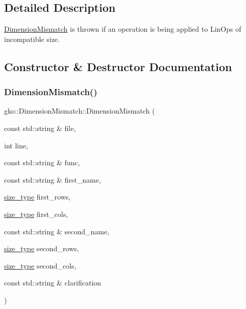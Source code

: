 \subsection{Detailed Description}
\hyperlink{classgko_1_1DimensionMismatch}{Dimension\+Mismatch} is thrown if an operation is being applied to Lin\+Ops of incompatible size. 

\subsection{Constructor \& Destructor Documentation}
\mbox{\label{classgko_1_1DimensionMismatch_ae9ece719cbd41a39835655ba3e70aa47}} 
\subsubsection{\texorpdfstring{Dimension\+Mismatch()}{DimensionMismatch()}}
{\footnotesize\ttfamily gko\+::\+Dimension\+Mismatch\+::\+Dimension\+Mismatch (\begin{DoxyParamCaption}\item[{const std\+::string \&}]{file,  }\item[{int}]{line,  }\item[{const std\+::string \&}]{func,  }\item[{const std\+::string \&}]{first\+\_\+name,  }\item[{\hyperlink{namespacegko_a6e5c95df0ae4e47aab2f604a22d98ee7}{size\+\_\+type}}]{first\+\_\+rows,  }\item[{\hyperlink{namespacegko_a6e5c95df0ae4e47aab2f604a22d98ee7}{size\+\_\+type}}]{first\+\_\+cols,  }\item[{const std\+::string \&}]{second\+\_\+name,  }\item[{\hyperlink{namespacegko_a6e5c95df0ae4e47aab2f604a22d98ee7}{size\+\_\+type}}]{second\+\_\+rows,  }\item[{\hyperlink{namespacegko_a6e5c95df0ae4e47aab2f604a22d98ee7}{size\+\_\+type}}]{second\+\_\+cols,  }\item[{const std\+::string \&}]{clarification }\end{DoxyParamCaption})\hspace{0.3cm}{\ttfamily [inline]}}



